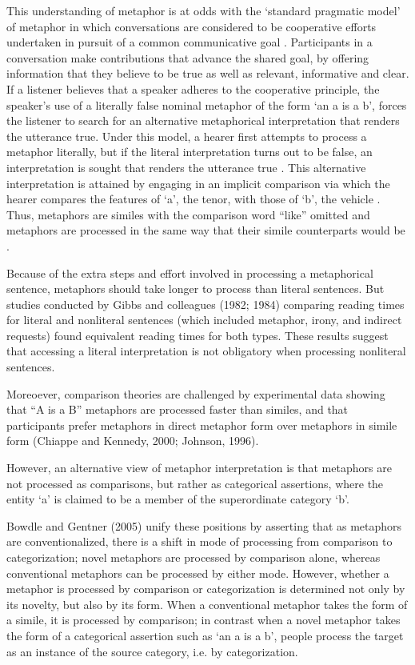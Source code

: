 \documentclass[]{article}
\begin{document}
	This understanding of metaphor is at odds with the `standard pragmatic model' of metaphor in which conversations are considered to be cooperative efforts undertaken in pursuit of  a common communicative goal \parencite{grice_logic_1975}.  Participants in a conversation make contributions that advance the shared goal, by offering information that they believe to be true as well as relevant, informative and clear. If a listener believes that a speaker adheres to the cooperative principle, the speaker's use of a literally false nominal metaphor of the form `an a is a b', forces the listener to search for an alternative metaphorical interpretation that renders the utterance true. Under this model, a hearer first attempts to process a metaphor literally, but if the literal interpretation turns out to be false, an interpretation is sought that renders the utterance true \parencite{searle_metaphor_1993}. This alternative interpretation is attained by engaging in an implicit comparison via which the hearer compares the features of `a’, the tenor, with those of `b’, the vehicle \parencite{ortony_beyond_1979, gentner_structure-mapping:_1983}. Thus, metaphors are similes with the comparison word “like” omitted and metaphors are processed in the same way that their simile counterparts would be \parencite{glucksberg_how_1993}.
	
	Because of the extra steps and effort involved in processing a metaphorical sentence, metaphors should take longer to process than literal sentences. But studies conducted by Gibbs and colleagues (1982; 1984) comparing reading times for literal and nonliteral sentences (which included metaphor, irony, and indirect requests) found equivalent reading times for both types. These results suggest that accessing a literal interpretation is not obligatory when processing nonliteral sentences. 
	
	Moreoever, comparison theories are challenged by experimental data showing that “A is a B” metaphors are processed faster than similes, and that participants prefer metaphors in direct metaphor form over metaphors in simile form (Chiappe and Kennedy, 2000; Johnson, 1996).
	
	However, an alternative view of metaphor interpretation is that metaphors are not processed as comparisons, but rather as categorical assertions, where the entity ‘a’ is claimed to be a member of the superordinate category ‘b’.  
	
	Bowdle and Gentner (2005) unify these positions by asserting that as metaphors are conventionalized, there is a shift in mode of processing from comparison to categorization; novel metaphors are processed by comparison alone, whereas conventional metaphors can be processed by either mode.  However, whether a metaphor is processed by comparison or categorization is determined not only by its novelty, but also by its form.  When a conventional metaphor takes the form of a simile, it is processed by comparison; in contrast when a novel metaphor takes the form of a categorical assertion such as ‘an a is a b’, people process the target as an instance of the source category, i.e. by categorization.
	
\end{document}
